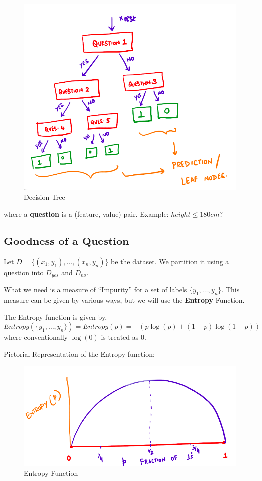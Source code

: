 \documentclass[
]{article}
\begin{document}
\begin{figure}
\centering
\includegraphics{../images/decision_tree.png}
\caption{Decision Tree}
\end{figure}

where a \textbf{question} is a (feature, value) pair. Example:
\(height\le180cm\)?

\hypertarget{goodness-of-a-question}{%
\subsection{Goodness of a Question}\label{goodness-of-a-question}}

Let \(D=\{(x_1, y_1), \ldots, (x_n,y_n)\}\) be the dataset. We partition
it using a question into \(D_{yes}\) and \(D_{no}\).

What we need is a measure of ``Impurity'' for a set of labels
\(\{y_1, \ldots, y_n\}\). This measure can be given by various ways, but
we will use the \textbf{Entropy} Function.

The Entropy function is given by, \[
Entropy(\{y_1, \ldots, y_n\}) = Entropy(p) = -\left( p\log(p)+(1-p)\log(1-p) \right )
\] where conventionally \(\log(0)\) is treated as \(0\).

Pictorial Representation of the Entropy function:

\begin{figure}
\centering
\includegraphics{../images/entropy.png}
\caption{Entropy Function}
\end{figure}
\end{document}

